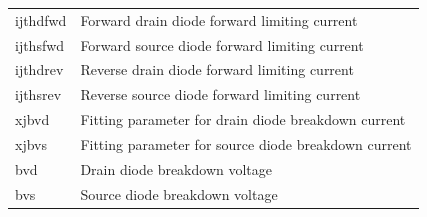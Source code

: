 \begin{longtable}{l l}
{\small ijthdfwd} & {\small Forward drain diode forward limiting current} \\
{\small ijthsfwd} & {\small Forward source diode forward limiting current} \\
{\small ijthdrev} & {\small Reverse drain diode forward limiting current} \\
{\small ijthsrev} & {\small Reverse source diode forward limiting current} \\
{\small xjbvd} & {\small Fitting parameter for drain diode breakdown current} \\
{\small xjbvs} & {\small Fitting parameter for source diode breakdown current} \\
{\small bvd} & {\small Drain diode breakdown voltage} \\
{\small bvs} & {\small Source diode breakdown voltage} \\


\end{longtable}
